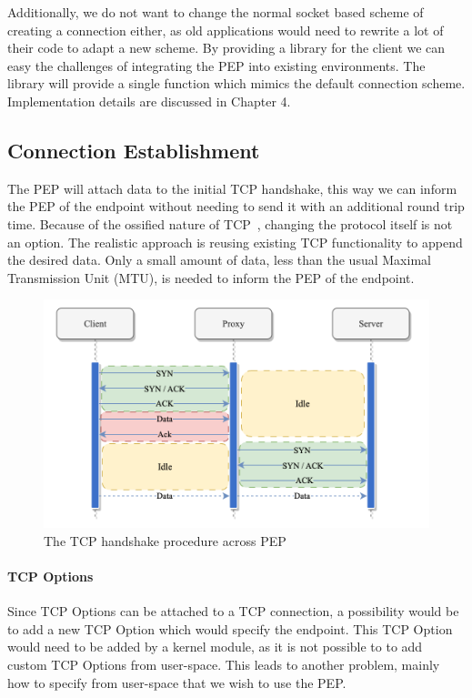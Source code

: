 \documentclass[a4paper,english, 11pt]{report}
\begin{document}
Additionally, we do not want to change the normal socket based scheme of creating a connection either, as old applications would need to rewrite a lot of their code to adapt a new scheme. By providing a library for the client we can easy the challenges of integrating the PEP into existing environments. The library will provide a single function which mimics the default connection scheme. Implementation details are discussed in Chapter 4.

\subsection{Connection Establishment}  
The PEP will attach data to the initial TCP handshake, this way we can inform the PEP of the endpoint without needing to send it with an additional round trip time. Because of the ossified nature of TCP~\cite{tcp_extendable}, changing the protocol itself is not an option. The realistic approach is reusing existing TCP functionality to append the desired data. Only a small amount of data, less than the usual Maximal Transmission Unit (MTU), is needed to inform the PEP of the endpoint. \\

\begin{figure} %
	\centering
	\includegraphics[scale=0.75]{../diagrams/drawio/tcphandshake_primitiv.png}
  	\caption{The TCP handshake procedure across PEP}
  	\label{fig:tcphandshake_primitiv}
\end{figure}

\paragraph{TCP Options}
Since TCP Options can be attached to a TCP connection, a possibility would be to add a new TCP Option which would specify the endpoint. This TCP Option would need to be added by a kernel module, as it is not possible to to add custom TCP Options from user-space. This leads to another problem, mainly how to specify from user-space that we wish to use the PEP.\\
\end{document}
